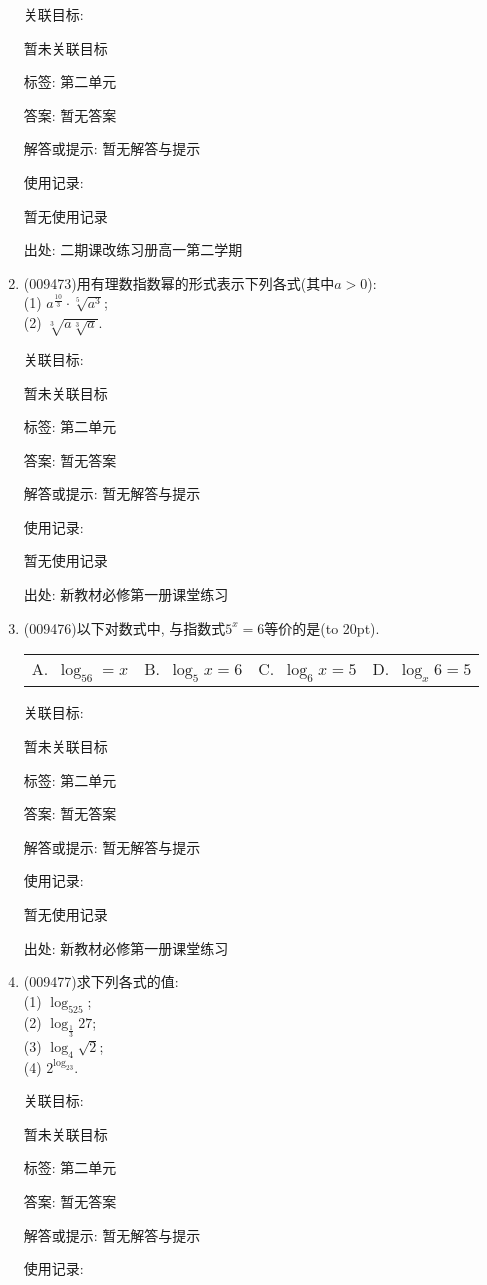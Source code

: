\documentclass[10pt,a4paper]{article}
\newcommand{\bracket}[1]{(\hbox to #1pt{})}
\newcommand{\fourch}[4]{\par\begin{tabular}{p{.23\textwidth}p{.23\textwidth}p{.23\textwidth}p{.23\textwidth}}
A.~#1 &B.~#2& C.~#3& D.~#4
\end{tabular}}
\begin{document}
\begin{enumerate}[1.]
关联目标:

暂未关联目标



标签: 第二单元

答案: 暂无答案

解答或提示: 暂无解答与提示

使用记录:

暂无使用记录


出处: 二期课改练习册高一第二学期
\item { (009473)}用有理数指数幂的形式表示下列各式(其中$a>0$):\\
(1) $a^{\frac{10}3}\cdot \sqrt[5]{a^3}$;\\
(2) $\sqrt[3]{a\sqrt[3]{a}}$.


关联目标:

暂未关联目标



标签: 第二单元

答案: 暂无答案

解答或提示: 暂无解答与提示

使用记录:

暂无使用记录


出处: 新教材必修第一册课堂练习
\item { (009476)}以下对数式中, 与指数式$5^x=6$等价的是\bracket{20}.
\fourch{$\log_56=x$}{$\log_5x=6$}{$\log_6x=5$}{$\log_x6=5$}


关联目标:

暂未关联目标



标签: 第二单元

答案: 暂无答案

解答或提示: 暂无解答与提示

使用记录:

暂无使用记录


出处: 新教材必修第一册课堂练习
\item { (009477)}求下列各式的值:\\
(1) $\log_525$;\\
(2) $\log_{\frac 13}27$;\\
(3) $\log_4\sqrt 2$;\\
(4) $2^{\log_23}$.


关联目标:

暂未关联目标



标签: 第二单元

答案: 暂无答案

解答或提示: 暂无解答与提示

使用记录:


\end{enumerate}
\end{document}
